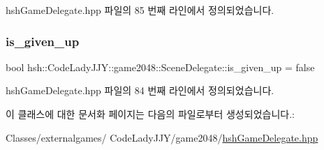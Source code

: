 hsh\+Game\+Delegate.\+hpp 파일의 85 번째 라인에서 정의되었습니다.

\mbox{\label{classhsh_1_1_code_lady_j_j_y_1_1game2048_1_1_scene_delegate_a8ea6710e5c00d1af16c4566260c62501}} 
\subsubsection{\texorpdfstring{is\+\_\+given\+\_\+up}{is\_given\_up}}
{\footnotesize\ttfamily bool hsh\+::\+Code\+Lady\+J\+J\+Y\+::game2048\+::\+Scene\+Delegate\+::is\+\_\+given\+\_\+up = false\hspace{0.3cm}{\ttfamily [protected]}}



hsh\+Game\+Delegate.\+hpp 파일의 84 번째 라인에서 정의되었습니다.



이 클래스에 대한 문서화 페이지는 다음의 파일로부터 생성되었습니다.\+:\begin{DoxyCompactItemize}
\item 
Classes/externalgames/ Code\+Lady\+J\+J\+Y/game2048/\hyperlink{hsh_game_delegate_8hpp}{hsh\+Game\+Delegate.\+hpp}\end{DoxyCompactItemize}
